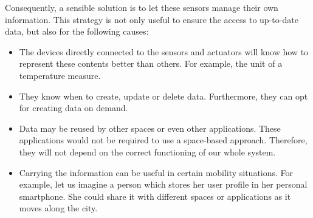 Consequently, a sensible solution is to let these sensors manage their own information.
This strategy is not only useful to ensure the access to up-to-date data, but also for the following causes: %
\begin{itemize}
  \item The devices directly connected to the sensors and actuators will know how to represent these contents better than others. %
	For example, the unit of a temperature measure.
  \item They know when to create, update or delete data. %
        Furthermore, they can opt for creating data on demand.
  \item Data may be reused by other spaces or even other applications. %
        These applications would not be required to use a space-based approach.
        Therefore, they will not depend on the correct functioning of our whole system. %
  \item Carrying the information can be useful in certain mobility situations.
        For example, let us imagine a person which stores her user profile in her personal smartphone.
        She could share it with different spaces or applications as it moves along the city.
\end{itemize}


